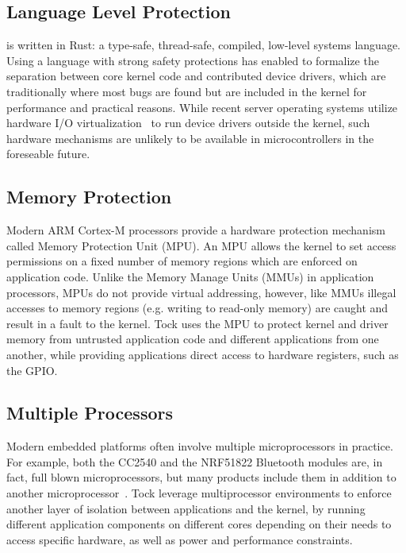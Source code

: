 \subsection{Language Level Protection}

\name is written in Rust: a type-safe, thread-safe, compiled, low-level systems
language. Using a language with strong safety protections has enabled \name to
formalize the separation between core kernel code and contributed device
drivers, which are traditionally where most bugs are found but are included in
the kernel for performance and practical reasons. While recent server operating
systems utilize hardware I/O virtualization~\cite{arrakis:osdi2014, ix:osdi2014}
to run device drivers outside the kernel, such hardware mechanisms are unlikely
to be available in microcontrollers in the foreseable future.

\subsection{Memory Protection}

Modern ARM Cortex-M processors provide a hardware protection mechanism called
Memory Protection Unit (MPU).  An MPU allows the kernel to set access
permissions on a fixed number of memory regions which are enforced on
application code. Unlike the Memory Manage Units (MMUs) in application
processors, MPUs do not provide virtual addressing, however, like MMUs illegal
accesses to memory regions (e.g. writing to read-only memory) are caught and
result in a fault to the kernel. Tock uses the MPU to protect kernel and driver
memory from untrusted application code and different applications from one
another, while providing applications direct access to hardware registers, such
as the GPIO.

\subsection{Multiple Processors}

Modern embedded platforms often involve multiple microprocessors in practice.
For example, both the CC2540 and the NRF51822 Bluetooth modules are, in fact,
full blown microprocessors, but many products include them in addition to
another microprocessor~. Tock leverage
multiprocessor environments to enforce another layer of isolation between
applications and the kernel, by running different application components on
different cores depending on their needs to access specific hardware, as well as
power and performance constraints.

